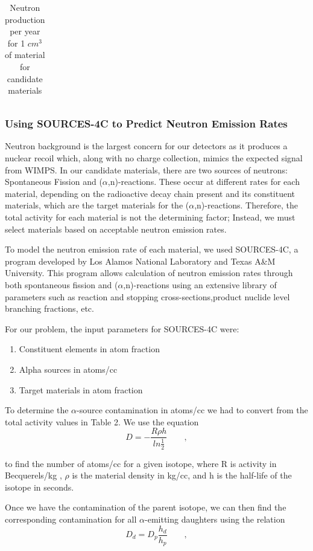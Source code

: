 \documentclass{report}
\begin{document}
\begin{multicols}{2}
\begin{table}[htb]
\begin{threeparttable}
\begin{tabular}{l|ccccc}
\end{tabular}
\caption{Neutron production per year for 1 $cm^{3}$ of material for candidate materials}
\end{threeparttable}
\end{table}

\subsubsection{Using SOURCES-4C to Predict Neutron Emission Rates}
Neutron background is the largest concern for our detectors as it produces a
nuclear recoil which, along with no charge collection, mimics the expected signal
from WIMPS. In our candidate materials, there are two sources of neutrons:
Spontaneous Fission and ($\alpha$,n)-reactions. These occur at different rates
for each material, depending on the radioactive decay chain present and its
constituent materials, which are the target materials for the ($\alpha$,n)-reactions.
Therefore, the total activity for each material is not the determining factor;
Instead, we must select materials based on acceptable neutron emission rates.

To model the neutron emission rate of each material, we used SOURCES-4C, a program
developed by Los Alamos National Laboratory and Texas A\&M University. This
program allows calculation of neutron emission rates through both spontaneous
fission and ($\alpha$,n)-reactions using an extensive library of parameters
such as reaction and stopping cross-sections,product nuclide level branching
fractions, etc.

For our problem, the input parameters for SOURCES-4C were:
\begin{enumerate}
\item Constituent elements in atom fraction
\item Alpha sources in atoms/cc
\item Target materials in atom fraction
\end{enumerate}

To determine the $\alpha$-source contamination in atoms/cc we had to convert
from the total activity values in Table 2. We use the equation
$$
D = -\frac{R \rho h}{ln\frac{1}{2}} \qquad,
$$

to find the number of atoms/cc for a given isotope, where R is activity in
Becquerels/kg , $\rho$ is the material density in kg/cc, and h is the half-life
of the isotope in seconds.

Once we have the contamination of the parent isotope, we can then find the
corresponding contamination for all $\alpha$-emitting daughters using the relation
$$
D_{d} = D_{p}\frac{h_{d}}{h_{p}} \qquad,
$$


\end{multicols}
\end{document}
